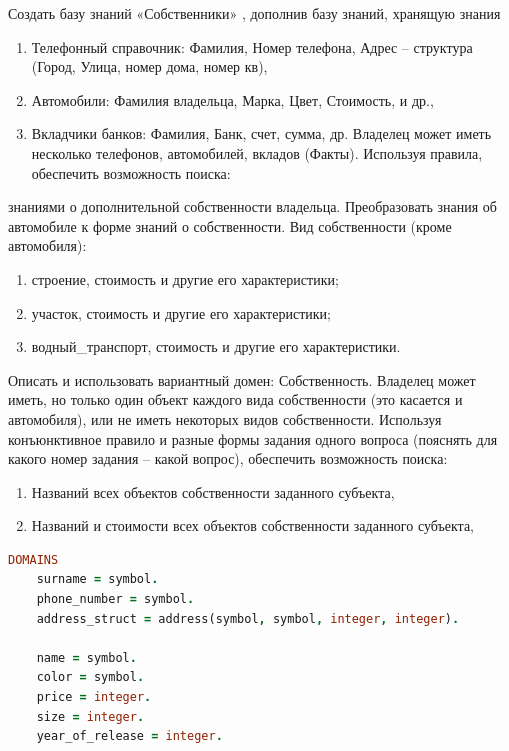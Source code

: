 \documentclass[a4paper,oneside,12pt]{extreport}
\begin{document}
\begin{task}
    Создать базу знаний «Собственники» , дополнив базу знаний, хранящую знания
    \begin{enumerate}
        \item Телефонный справочник: Фамилия, Номер телефона, Адрес – структура (Город, Улица, номер дома, номер кв),
        \item Автомобили: Фамилия владельца, Марка, Цвет, Стоимость, и др.,
        \item Вкладчики банков: Фамилия, Банк, счет, сумма, др.
    Владелец может иметь несколько телефонов, автомобилей, вкладов (Факты).
    Используя правила, обеспечить возможность поиска:
    \end{enumerate}

    знаниями о дополнительной собственности владельца. Преобразовать знания об
    автомобиле к форме знаний о собственности.
    Вид собственности (кроме автомобиля):

    \begin{enumerate}
        \item строение, стоимость и другие его характеристики;
        \item участок, стоимость и другие его характеристики;
        \item водный\_транспорт, стоимость и другие его характеристики.
    \end{enumerate}

    Описать и использовать вариантный домен: Собственность.
    Владелец может иметь, но только один объект каждого вида собственности 
    (это касается и автомобиля), или не иметь некоторых видов собственности.
    Используя конъюнктивное правило и разные формы задания одного вопроса
    (пояснять для какого номер задания – какой вопрос), 
    обеспечить возможность поиска:

    \begin{enumerate}
        \item Названий всех объектов собственности заданного субъекта,
        \item Названий и стоимости всех объектов собственности заданного субъекта,
    \end{enumerate}

    \begin{lstlisting}[language=Prolog]
DOMAINS 
    surname = symbol.
    phone_number = symbol.
    address_struct = address(symbol, symbol, integer, integer).

    name = symbol.
    color = symbol.
    price = integer.
    size = integer.
    year_of_release = integer.
    

\end{lstlisting}
\end{task}
\end{document}
